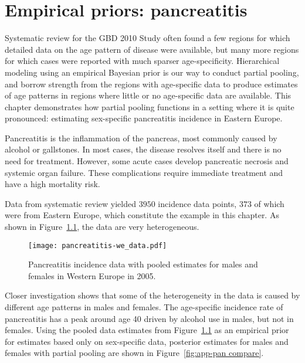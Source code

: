 \chapter{Empirical priors: pancreatitis}
\label{applications-priors_empirical}

Systematic review for the GBD 2010 Study often found a few regions for
which detailed data on the age pattern of disease were available, but
many more regions for which cases were reported with much sparser
age-specificity.  Hierarchical modeling using an empirical Bayesian
prior is our way to conduct partial pooling, and borrow strength from
the regions with age-specific data to produce estimates of age
patterns in regions where little or no age-specific data are available.
This chapter demonstrates how partial pooling functions in a
setting where it is quite pronounced: estimating sex-specific
pancreatitis incidence in Eastern Europe.

Pancreatitis is the inflammation of the pancreas, most commonly
caused by alcohol or gallstones.  In most cases, the disease resolves
itself and there is no need for treatment.  However, some acute
cases develop pancreatic necrosis and systemic organ failure.  These
complications require immediate treatment and have a high mortality risk.
\cite{raraty_acute_2004, banks_epidemiology_2002, sekimoto_JPN_2006}

Data from systematic review yielded $3950$ incidence data points,
$373$ of which were from Eastern Europe, which constitute the example
in this chapter.  As shown in Figure~\ref{fig:app-pan data}, the data
are very heterogeneous.

    \begin{figure}[h]
        \begin{center}
            \texttt{[image: pancreatitis-we\_data.pdf]}
            \caption{Pancreatitis incidence data
              with pooled estimates for males and females in Western Europe in 2005.}
            \label{fig:app-pan data}
        \end{center}
    \end{figure}

Closer investigation shows that some of the heterogeneity in the data
is caused by different age patterns in males and females.  The
age-specific incidence rate of pancreatitis has a peak around age 40
driven by alcohol use in males, but not in females.  Using the pooled data estimates from
Figure~\ref{fig:app-pan data} as an empirical prior for estimates
based only on sex-specific data, posterior estimates for males and
females with partial pooling are shown in Figure~\ref{fig:app-pan
  compare}.

